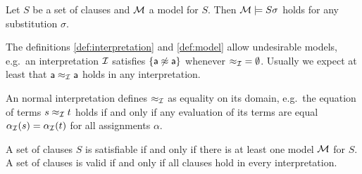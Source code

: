 \begin{lemma}[Instantiation]\label{lem:instantiation}
	Let $S$ be a set of clauses and ${\mathcal M}$ a model for $S$.
	Then ${\mathcal M}\models S\sigma$ holds for any substitution $\sigma$.
\end{lemma}

\begin{example}The definitions \ref{def:interpretation} and \ref{def:model} 
	allow undesirable models, 
	e.g.~an interpretation ${\mathcal I}$ satisfies $\{ {\mathsf a}\not\approx{\mathsf a} \}$ 
		whenever ${\approx_{\mathcal I}} = \emptyset$.
	Usually we expect at least that ${\mathsf a}\approx_{\mathcal I}{\mathsf a}$ holds in any interpretation.
\end{example}

\begin{definition}
	An {\myem normal} interpretation defines $\approx_{\mathcal I}$ as equality on its domain,
	e.g.~the equation of terms $s \approx_{\mathcal I} t$ holds if and only 
	if any evaluation of its terms are equal $\alpha_{\mathcal I}(s) = \alpha_{\mathcal I}(t)$ 
	for all assignments $\alpha$.
\end{definition}

\begin{definition}
	A set of clauses $S$ is {\myem satisfiable} if and only if there is at least one model ${\mathcal M}$ for $S$. 
	A set of clauses is  {\myem valid} if and only if all clauses hold in every interpretation.
\end{definition}

